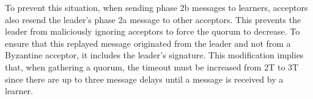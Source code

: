 To prevent this situation, when sending phase 2b messages to learners, acceptors also resend the leader's phase 2a message to other acceptors. This prevents the leader from maliciously ignoring acceptors to force the quorum to decrease. To ensure that this replayed message originated from the leader and not from a Byzantine acceptor, it includes the leader's signature. This modification implies that, when gathering a quorum, the timeout must be increased from 2T to 3T since there are up to three message delays until a message is received by a learner.
